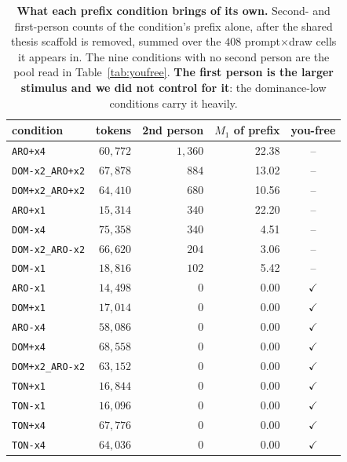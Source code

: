 \begin{table}[t]\centering\small
\caption{\textbf{What each prefix condition brings of its own.} Second- and first-person counts of the condition's prefix alone, after the shared thesis scaffold is removed, summed over the $408$ prompt$\times$draw cells it appears in. The nine conditions with no second person are the pool read in Table~\ref{tab:youfree}. \textbf{The first person is the larger stimulus and we did not control for it}: the dominance-low conditions carry it heavily.}
\label{tab:onek}
\begin{tabular}{lrrrc}
\toprule
condition & tokens & 2nd person & $M_1$ of prefix & you-free \\
\midrule
\texttt{ARO+x4} & $60{,}772$ & $1{,}360$ & 22.38 & -- \\
\texttt{DOM-x2\_ARO+x2} & $67{,}878$ & $884$ & 13.02 & -- \\
\texttt{DOM+x2\_ARO+x2} & $64{,}410$ & $680$ & 10.56 & -- \\
\texttt{ARO+x1} & $15{,}314$ & $340$ & 22.20 & -- \\
\texttt{DOM-x4} & $75{,}358$ & $340$ & 4.51 & -- \\
\texttt{DOM-x2\_ARO-x2} & $66{,}620$ & $204$ & 3.06 & -- \\
\texttt{DOM-x1} & $18{,}816$ & $102$ & 5.42 & -- \\
\texttt{ARO-x1} & $14{,}498$ & $0$ & 0.00 & $\checkmark$ \\
\texttt{DOM+x1} & $17{,}014$ & $0$ & 0.00 & $\checkmark$ \\
\texttt{ARO-x4} & $58{,}086$ & $0$ & 0.00 & $\checkmark$ \\
\texttt{DOM+x4} & $68{,}558$ & $0$ & 0.00 & $\checkmark$ \\
\texttt{DOM+x2\_ARO-x2} & $63{,}152$ & $0$ & 0.00 & $\checkmark$ \\
\texttt{TON+x1} & $16{,}844$ & $0$ & 0.00 & $\checkmark$ \\
\texttt{TON-x1} & $16{,}096$ & $0$ & 0.00 & $\checkmark$ \\
\texttt{TON+x4} & $67{,}776$ & $0$ & 0.00 & $\checkmark$ \\
\texttt{TON-x4} & $64{,}036$ & $0$ & 0.00 & $\checkmark$ \\
\bottomrule
\end{tabular}
\end{table}
